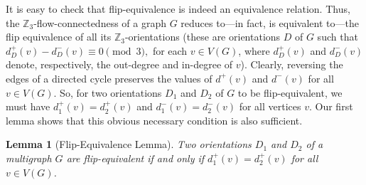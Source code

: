 \documentclass[a4paper,12pt]{article}
\theoremstyle{plain}
\newtheorem{lem}[theorem]{Lemma}
\theoremstyle{definition}
\newcommand{\Z}{\mathbb{Z}}
\begin{document}
It is easy to check that flip-equivalence is indeed an equivalence relation. Thus, the $\Z_3$-flow-connectedness of a graph $G$ reduces to---in fact, is equivalent to---the flip equivalence of all its $\Z_3$-orientations (these are orientations $D$ of $G$ such that $d_D^+(v) - d_D^-(v) \equiv 0 \pmod{3},$ for each $v\in V(G)$, where $d_D^+(v)$ and $d_D^-(v)$ denote, respectively, the out-degree and in-degree of $v$).
Clearly, reversing the edges of a directed cycle preserves the values of $d^+(v)$ and $d^-(v)$ for all $v\in V(G)$. So, for two orientations $D_1$ and $D_2$ of $G$ to be flip-equivalent, we must have
$d^+_1(v)=d^+_2(v)$ and $d^-_1(v)=d^-_2(v)$ for all vertices $v$.  Our first lemma shows that this obvious necessary condition is also sufficient.


\begin{lem}[Flip-Equivalence Lemma]
	Two orientations $D_1$ and $D_2$ of a multigraph $G$ are flip-equivalent if and only if 
	$d_1^+(v)=d_2^+(v)$ for all $v\in V(G)$.
	\label{flip-equiv-lem}
\end{lem}
\end{document}
